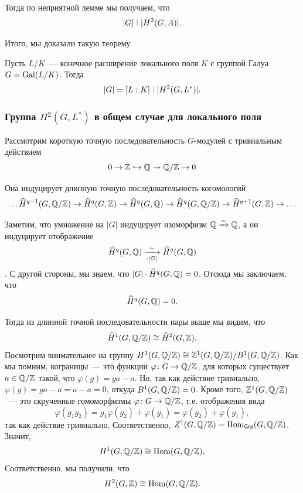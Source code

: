 	  Тогда по неприятной лемме мы получаем, что 
	  \[
	  	|G| \divby |H^2(G, A)|.
	  \]

	Итого, мы доказали такую теорему 

	\begin{theorem} 
		Пусть $L/K$~--- конечное расширение локального поля $K$ с группой Галуа $G = \operatorname{Gal}(L/K)$. Тогда 
		\[
			|G| = [L : K] \divby |H^2(G, L^*)|.  		
	  	\]  	
  	\end{theorem}	  

  	\subsubsection{Группа $H^2(G, L^*)$ в общем случае для локального поля}

  	Рассмотрим короткую точную последовательность  $G$-модулей с тривиальным действием
  	\[
  		0 \to \mathbb{Z} \hookrightarrow \mathbb{Q} \twoheadrightarrow \mathbb{Q}/\mathbb{Z} \to 0
  	\]

  	Она индуцирует длинную точную последовательность когомологий 
  	\[
  		\ldots \widehat{H}^{q - 1}(G, \mathbb{Q}/\mathbb{Z}) \to \widehat{H}^q(G, \mathbb{Z}) \to \widehat{H}^q(G, \mathbb{Q}) \to \widehat{H}^{q}(G, \mathbb{Q}/\mathbb{Z}) \to \widehat{H}^{q + 1}(G, \mathbb{Z}) \to \ldots 
  	\]

  	Заметим, что умножение на $|G|$ индуцирует изоморфизм $\mathbb{Q} \xrightarrow{\sim} \mathbb{Q}$, а он индуцирует отображение 
  	\[
  		\widehat{H}^{q}(G, \mathbb{Q}) \xrightarrow[\cdot |G|]{\sim} \widehat{H}^{q}(G, \mathbb{Q})
  	\]
  	. С другой стороны, мы знаем, что $|G| \cdot \widehat{H}^q(G, \mathbb{Q}) = 0$. Отсюда мы заключаем, что 
  	\[
  		\widehat{H}^q(G, \mathbb{Q}) = 0.
  	\]

  	Тогда из длинной точной последовательности пары выше мы видим, что 
  	\[
  		\widehat{H}^1(G, \mathbb{Q}/\mathbb{Z}) \cong \widehat{H}^2(G, \mathbb{Z}).
  	\]
  	Посмотрим внимательнее на группу $H^{1}(G, \mathbb{Q}/\mathbb{Z}) \cong \mathbb{Z}^{1}(G, \mathbb{Q}/\mathbb{Z})/B^1(G, \mathbb{Q}/\mathbb{Z})$. Как мы помним, кограницы~--- это функции $\varphi\colon G \to \mathbb{Q}/\mathbb{Z}$, для которых существует $a \in \mathbb{Q}/\mathbb{Z}$ такой, что $\varphi(g) = ga - a$. Но, так как действие тривиально, $\varphi(g) = ga - a = a - a = 0$, откуда $B^1(G, \mathbb{Q}/\mathbb{Z}) = 0$. Кроме того, $\mathbb{Z}^{1}(G, \mathbb{Q}/\mathbb{Z})$~--- это скрученные гомоморфизмы $\varphi\colon G \to \mathbb{Q}/\mathbb{Z}$, т.е. отображения вида 
  	\[
  		\varphi(g_1 g_2) = g_1 \varphi(g_2) + \varphi(g_1) = \varphi(g_2) + \varphi(g_1),
  	\]
  	так как действие тривиально. Соответственно, $Z^1(G, \mathbb{Q}/\mathbb{Z}) = \operatorname{Hom}_{\mathsf{Grp}}(G, \mathbb{Q}/\mathbb{Z})$. Значит, 
  	\[
  		H^1(G, \mathbb{Q}/\mathbb{Z}) \cong \operatorname{Hom}(G, \mathbb{Q}/\mathbb{Z}). 
  	\]
  	Соответственно, мы получили, что 
  	\[
  		H^2(G, \mathbb{Z}) \cong \operatorname{Hom}(G, \mathbb{Q}/\mathbb{Z}).
  	\]

